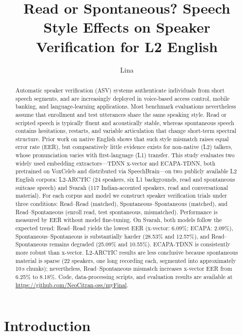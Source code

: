 \documentclass[cameraready]{Interspeech}
\title{Read or Spontaneous? Speech Style Effects on Speaker Verification for L2 English}
\author[affiliation={1}]{Lina}{Na}
\begin{document}
\maketitle

\begin{abstract}
Automatic speaker verification (ASV) systems authenticate individuals from short speech segments, and are increasingly deployed in voice-based access control, mobile banking, and language-learning applications. Most benchmark evaluations nevertheless assume that enrollment and test utterances share the same speaking style. Read or scripted speech is typically fluent and acoustically stable, whereas spontaneous speech contains hesitations, restarts, and variable articulation that change short-term spectral structure. Prior work on native English shows that such style mismatch raises equal error rate (EER), but comparatively little evidence exists for non-native (L2) talkers, whose pronunciation varies with first-language (L1) transfer. This study evaluates two widely used embedding extractors---TDNN x-vector and ECAPA-TDNN, both pretrained on VoxCeleb and distributed via SpeechBrain---on two publicly available L2 English corpora: L2-ARCTIC (24 speakers, six L1 backgrounds, read and spontaneous suitcase speech) and Svarah (117 Indian-accented speakers, read and conversational material). For each corpus and model we construct speaker verification trials under three conditions: Read--Read (matched), Spontaneous--Spontaneous (matched), and Read--Spontaneous (enroll read, test spontaneous, mismatched). Performance is measured by EER without model fine-tuning. On Svarah, both models follow the expected trend: Read--Read yields the lowest EER (x-vector: 6.09\%; ECAPA: 2.09\%), Spontaneous--Spontaneous is substantially harder (28.53\% and 12.57\%), and Read--Spontaneous remains degraded (25.09\% and 10.55\%). ECAPA-TDNN is consistently more robust than x-vector. L2-ARCTIC results are less conclusive because spontaneous material is sparse (22 speakers, one long recording each, segmented into approximately 10\,s chunks); nevertheless, Read--Spontaneous mismatch increases x-vector EER from 6.25\% to 8.18\%. Code, data-processing scripts, and evaluation results are available at \url{https://github.com/NeoCitran-oss/myFinal}.
\end{abstract}

\section{Introduction}
\label{sec:intro}
\end{document}
